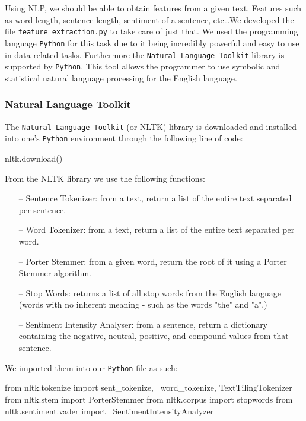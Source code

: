 \documentclass[runningheads]{llncs}
\begin{document}
Using NLP, we should be able to obtain features from a given text. Features such as word length, sentence length, sentiment of a sentence, etc\ldots We developed the file \texttt{feature\_extraction.py} to take care of just that. We used the programming language \texttt{Python} for this task due to it being incredibly powerful and easy to use in data-related tasks. Furthermore the \texttt{Natural Language Toolkit} library is supported by \texttt{Python}. This tool allows the programmer to use symbolic and statistical natural language processing for the English language.

\subsubsection{Natural Language Toolkit}

The \texttt{Natural Language Toolkit} (or NLTK) library is downloaded and installed into one's \texttt{Python} environment through the following line of code:

\begin{python}
nltk.download()
\end{python}

From the NLTK library we use the following functions:
\begin{itemize}
    \item[--] Sentence Tokenizer: from a text, return a list of the entire text separated per sentence.
    \item[--] Word Tokenizer: from a text, return a list of the entire text separated per word.
    \item[--] Porter Stemmer: from a given word, return the root of it using a Porter Stemmer algorithm.
    \item[--] Stop Words: returns a list of all stop words from the English language (words with no inherent meaning - such as the words "the" and "a".)
    \item[--] Sentiment Intensity Analyser: from a sentence, return a dictionary containing the negative, neutral, positive, and compound values from that sentence.
\end{itemize}

We imported them into our \texttt{Python} file as such:

\begin{python}
from nltk.tokenize import sent_tokenize, \
word_tokenize, TextTilingTokenizer
from nltk.stem import PorterStemmer
from nltk.corpus import stopwords
from nltk.sentiment.vader import \ 
SentimentIntensityAnalyzer
\end{python}
\end{document}
